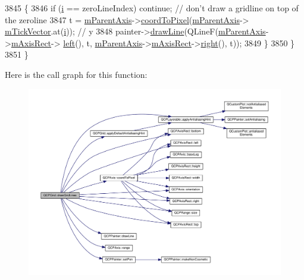 \begin{DoxyCode}
3845     \{
3846       \textcolor{keywordflow}{if} (\hyperlink{_comparision_pictures_2_createtest_image_8m_a6f6ccfcf58b31cb6412107d9d5281426}{i} == zeroLineIndex) \textcolor{keywordflow}{continue}; \textcolor{comment}{// don't draw a gridline on top of the zeroline}
3847       t = \hyperlink{class_q_c_p_grid_a9a8a76731e6e737b65b929fd1995cc88}{mParentAxis}->\hyperlink{class_q_c_p_axis_a985ae693b842fb0422b4390fe36d299a}{coordToPixel}(\hyperlink{class_q_c_p_grid_a9a8a76731e6e737b65b929fd1995cc88}{mParentAxis}->
      \hyperlink{class_q_c_p_axis_aae0f9b9973b85be601200f00f5825087}{mTickVector}.at(\hyperlink{_comparision_pictures_2_createtest_image_8m_a6f6ccfcf58b31cb6412107d9d5281426}{i})); \textcolor{comment}{// y}
3848       painter->\hyperlink{class_q_c_p_painter_a0b4b1b9bd495e182c731774dc800e6e0}{drawLine}(QLineF(\hyperlink{class_q_c_p_grid_a9a8a76731e6e737b65b929fd1995cc88}{mParentAxis}->\hyperlink{class_q_c_p_axis_a6f150b65a202f32936997960e331dfcb}{mAxisRect}->
      \hyperlink{class_q_c_p_axis_rect_a55b3ecf72a3a65b053f7651b88db458d}{left}(), t, \hyperlink{class_q_c_p_grid_a9a8a76731e6e737b65b929fd1995cc88}{mParentAxis}->\hyperlink{class_q_c_p_axis_a6f150b65a202f32936997960e331dfcb}{mAxisRect}->\hyperlink{class_q_c_p_axis_rect_a6d0f989fc552aa2b563cf82f8fc81e61}{right}(), t));
3849     \}
3850   \}
3851 \}
\end{DoxyCode}


Here is the call graph for this function\+:\nopagebreak
\begin{figure}[H]
\begin{center}
\leavevmode
\includegraphics[width=350pt]{class_q_c_p_grid_a3aff10e993f6625e255c19e4f97a09d8_cgraph}
\end{center}
\end{figure}





